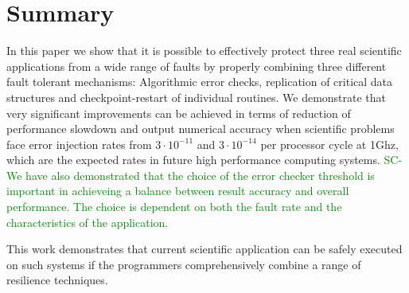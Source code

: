 \documentclass[10pt, conference, compsocconf]{IEEEtran}
\newcommand{\sui}[1]{%
  \textcolor{green}{SC-#1}
}
\begin{document}


\vspace{-10pt}
\section{Summary}
\vspace{-10pt}
\label{sec:summary}

In this paper we show that it is possible to effectively protect three real scientific applications from a wide range of faults by properly combining three different fault tolerant mechanisms:
Algorithmic error checks, replication of critical data structures and checkpoint-restart of individual routines.
We demonstrate that very significant improvements can be achieved in terms of reduction of performance slowdown and output numerical accuracy when scientific problems face error injection rates from $3 \cdot 10^{-11}$ and $3 \cdot 10^{-14}$ per processor cycle at 1Ghz, which are the expected rates in future high performance computing systems.
\sui{We have also demonstrated that the choice of the error checker threshold is important in achieveing a balance between result accuracy and overall performance. The choice is dependent on both the fault rate and the characteristics of the application.}
This work demonstrates that current scientific application can be safely executed on such systems if the programmers comprehensively combine a range of resilience techniques.



\end{document}
